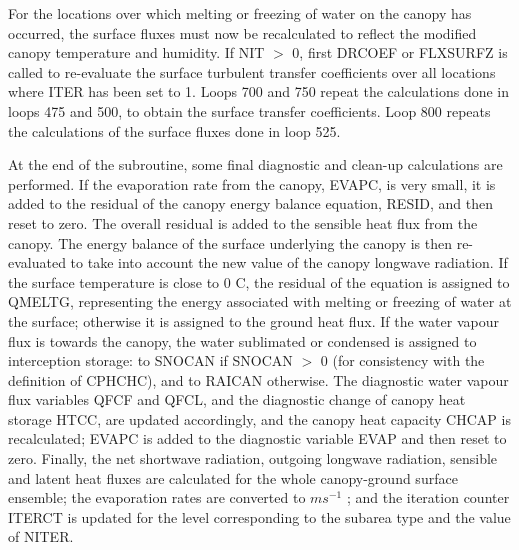 For the locations over which melting or freezing of water on the canopy has occurred, the surface fluxes must now be recalculated to reflect the modified canopy temperature and humidity. If N\+I\+T $>$ 0, first D\+R\+C\+O\+E\+F or F\+L\+X\+S\+U\+R\+F\+Z is called to re-\/evaluate the surface turbulent transfer coefficients over all locations where I\+T\+E\+R has been set to 1. Loops 700 and 750 repeat the calculations done in loops 475 and 500, to obtain the surface transfer coefficients. Loop 800 repeats the calculations of the surface fluxes done in loop 525.

At the end of the subroutine, some final diagnostic and clean-\/up calculations are performed. If the evaporation rate from the canopy, E\+V\+A\+P\+C, is very small, it is added to the residual of the canopy energy balance equation, R\+E\+S\+I\+D, and then reset to zero. The overall residual is added to the sensible heat flux from the canopy. The energy balance of the surface underlying the canopy is then re-\/evaluated to take into account the new value of the canopy longwave radiation. If the surface temperature is close to 0 C, the residual of the equation is assigned to Q\+M\+E\+L\+T\+G, representing the energy associated with melting or freezing of water at the surface; otherwise it is assigned to the ground heat flux. If the water vapour flux is towards the canopy, the water sublimated or condensed is assigned to interception storage\+: to S\+N\+O\+C\+A\+N if S\+N\+O\+C\+A\+N $>$ 0 (for consistency with the definition of C\+P\+H\+C\+H\+C), and to R\+A\+I\+C\+A\+N otherwise. The diagnostic water vapour flux variables Q\+F\+C\+F and Q\+F\+C\+L, and the diagnostic change of canopy heat storage H\+T\+C\+C, are updated accordingly, and the canopy heat capacity C\+H\+C\+A\+P is recalculated; E\+V\+A\+P\+C is added to the diagnostic variable E\+V\+A\+P and then reset to zero. Finally, the net shortwave radiation, outgoing longwave radiation, sensible and latent heat fluxes are calculated for the whole canopy-\/ground surface ensemble; the evaporation rates are converted to $m s^{-1}$ ; and the iteration counter I\+T\+E\+R\+C\+T is updated for the level corresponding to the subarea type and the value of N\+I\+T\+E\+R.